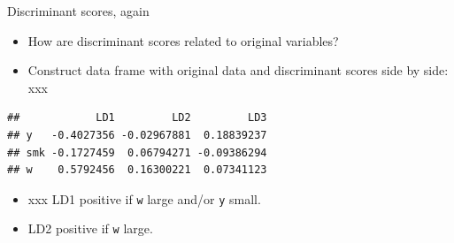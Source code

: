\documentclass[ignorenonframetext,]{beamer}
\newenvironment{Shaded}{\begin{snugshade}}{\end{snugshade}}
\newcommand{\DecValTok}[1]{\textcolor[rgb]{0.00,0.00,0.81}{#1}}
\newcommand{\FloatTok}[1]{\textcolor[rgb]{0.00,0.00,0.81}{#1}}
\newcommand{\KeywordTok}[1]{\textcolor[rgb]{0.13,0.29,0.53}{\textbf{#1}}}
\newcommand{\NormalTok}[1]{#1}
\newcommand{\OperatorTok}[1]{\textcolor[rgb]{0.81,0.36,0.00}{\textbf{#1}}}
\newcommand{\StringTok}[1]{\textcolor[rgb]{0.31,0.60,0.02}{#1}}
\begin{document}
\begin{frame}[fragile]{Discriminant scores, again}
\protect\hypertarget{discriminant-scores-again}{}

\begin{itemize}
\item
  How are discriminant scores related to original variables?
\item
  Construct data frame with original data and discriminant scores side
  by side: xxx
\end{itemize}

\footnotesize

\begin{Shaded}
\end{Shaded}

\begin{verbatim}
##            LD1         LD2         LD3
## y   -0.4027356 -0.02967881  0.18839237
## smk -0.1727459  0.06794271 -0.09386294
## w    0.5792456  0.16300221  0.07341123
\end{verbatim}

\begin{Shaded}
\end{Shaded}

\normalsize

\begin{itemize}
\item
  xxx LD1 positive if \texttt{w} large and/or \texttt{y} small.
\item
  LD2 positive if \texttt{w} large.
\end{itemize}

\end{frame}
\end{document}

